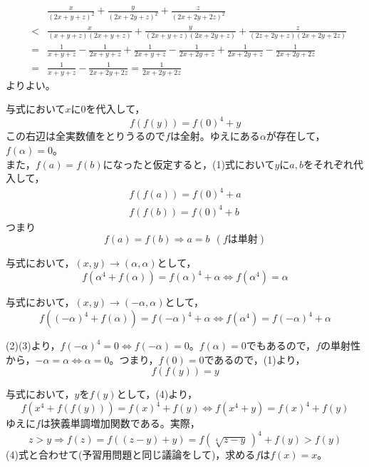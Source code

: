 \documentclass[a4paper,12pt]{jsarticle}
\begin{document}

\begin{eqnarray*}
  &&\frac{x}{(2x+y+z)^{2}}+\frac{y}{(2x+2y+z)^{2}}+\frac{z}{(2x+2y+2z)^{2}} \\
  &<& \frac{x}{(x+y+z)(2x+y+z)}+\frac{y}{(2x+y+z)(2x+2y+z)}+\frac{z}{(2z+2y+z)(2x+2y+2z)} \\
  &=& \frac{1}{x+y+z}-\frac{1}{2x+y+z}+\frac{1}{2x+y+z}-\frac{1}{2x+2y+z}+\frac{1}{2x+2y+z}-\frac{1}{2x+2y+2z} \\
  &=& \frac{1}{x+y+z}-\frac{1}{2x+2y+2z} = \frac{1}{2x+2y+2z}
\end{eqnarray*}
よりよい。
\bigskip



与式において$x$に0を代入して，
\begin{equation}
  f(f(y))=f(0)^{4}+y
\end{equation}
この右辺は全実数値をとりうるので$f$は全射。ゆえにある$\alpha$が存在して，$f(\alpha)=0$。\\
また，$f(a)=f(b)$になったと仮定すると，(1)式において$y$に$a,b$をそれぞれ代入して，
\begin{eqnarray*}
  f(f(a)) = f(0)^{4}+a \\
  f(f(b)) = f(0)^{4}+b 
\end{eqnarray*}
つまり
$$f(a)=f(b) \Rightarrow a = b \ \ (fは単射)$$

与式において，$(x,y)\rightarrow(\alpha,\alpha)$として，
\begin{equation}
  f(\alpha^{4}+f(\alpha)) = f(\alpha)^{4}+\alpha \Leftrightarrow f(\alpha^{4}) = \alpha
\end{equation}

与式において，$(x,y)\rightarrow(-\alpha,\alpha)$として，
\begin{equation}
  f((-\alpha)^{4}+f(\alpha)) = f(-\alpha)^{4}+\alpha \Leftrightarrow f(\alpha^{4}) = f(-\alpha)^{4}+\alpha
\end{equation}

(2)(3)より，$f(-\alpha)^{4}=0 \Leftrightarrow f(-\alpha) = 0$。$f(\alpha) = 0$でもあるので，$f$の単射性から，$-\alpha = \alpha \Leftrightarrow \alpha = 0$。つまり，$f(0)=0$であるので，(1)より，
\begin{equation}
  f(f(y)) = y
\end{equation}

与式において，$y$を$f(y)$として，(4)より，
$$ f(x^{4}+f(f(y))) = f(x)^{4}+f(y) \Leftrightarrow  f(x^{4}+y) = f(x)^{4}+f(y)$$
ゆえに$f$は狭義単調増加関数である。実際，
$$z>y \Rightarrow f(z) = f((z-y)+y) = f(\sqrt[4]{z-y}\,)^{4} + f(y) >f(y)$$
(4)式と合わせて(予習用問題と同じ議論をして)，求める$f$は$f(x)=x$。
\end{document}
